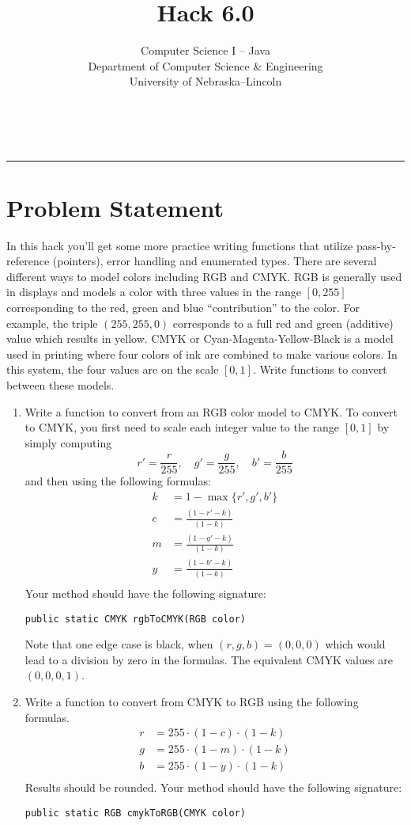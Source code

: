 \documentclass[12pt]{scrartcl}
\title{Hack 6.0}\let\Title\@title
\subtitle{Computer Science I -- Java\\
{\small
\vskip1cm
Department of Computer Science \& Engineering \\
University of Nebraska--Lincoln}
\vskip-1cm}
\date{~}
\begin{document}
\maketitle

\hrule



\section*{Problem Statement}

In this hack you'll get some more practice writing functions that utilize 
pass-by-reference (pointers), error handling and enumerated types.  There 
are several different
ways to model colors including RGB and CMYK.  RGB is generally used in displays
and models a color with three values in the range $[0, 255]$ corresponding to 
the red, green and blue ``contribution'' to the color.  For example, the
triple $(255, 255, 0)$ corresponds to a full red and green (additive) value
which results in yellow.  CMYK or Cyan-Magenta-Yellow-Black is a model used
in printing where four colors of ink are combined to make various colors.
In this system, the four values are on the scale $[0, 1]$.  Write 
functions to convert between these models.

\begin{enumerate}
\item Write a function to convert from an RGB color model to CMYK.  To 
convert to CMYK, you first need to scale each integer value to the range 
$[0, 1]$ by simply computing
	$$r' = \frac{r}{255}, \quad g' = \frac{g}{255}, \quad b' = \frac{b}{255}$$
	and then using the following formulas:
\begin{align*}
k & = 1-\max\{r', g', b'\} \\
c & = \frac{(1-r'-k)}{(1-k)} \\
m & = \frac{(1-g'-k)}{(1-k)} \\
y & = \frac{(1-b'-k)}{(1-k)} \\
\end{align*}
Your method should have the following signature:

\texttt{public static CMYK rgbToCMYK(RGB color)}

Note that one edge case is black, when $(r,g,b) = (0,0,0)$ which would lead to a 
division by zero in the formulas.  The equivalent CMYK values are $(0,0,0,1)$.


\item Write a function to convert from CMYK to RGB using the following formulas.
\begin{align*}
r & = 255 \cdot (1 - c) \cdot (1-k) \\
g & = 255 \cdot (1 - m) \cdot (1-k) \\
b & = 255 \cdot (1 - y) \cdot (1-k) \\
\end{align*}
Results should be rounded.  Your method should have the following signature:

\texttt{public static RGB cmykToRGB(CMYK color)}

\end{enumerate}
\end{document}
